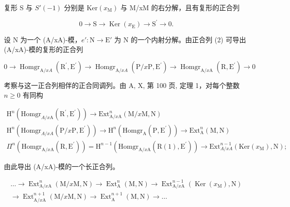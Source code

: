 复形 S 与 \(S'(-1)\) 分别是 \(\mathrm{Ker}(x_{\mathrm{M}})\) 与 M/xM 的右分解，且有复形的正合列

\[
0 \to \mathrm{S} \longrightarrow \operatorname{Ker} (x _ {\mathrm{E}}) \longrightarrow \mathrm{S} ^ {\prime} \to 0.\tag{3}
\]

设 N 为一个 (A/xA)-模，\(e': \mathrm{N} \to \mathrm{E}'\) 为 N 的一个内射分解。由正合列 (2) 可导出 (A/xA)-模的复形的正合列

\[
0 \to \operatorname{Homgr} _ {\mathrm{A} / x A} \left(\mathrm{R} ^ {\prime}, \mathrm{E} ^ {\prime}\right) \longrightarrow \operatorname{Homgr} _ {\mathrm{A} / x A} \left(\mathrm{P} / x \mathrm{P}, \mathrm{E} ^ {\prime}\right) \longrightarrow \operatorname{Homgr} _ {\mathrm{A} / x \mathrm{A}} \left(\mathrm{R}, \mathrm{E} ^ {\prime}\right)\rightarrow 0
\]

考察与这一正合列相伴的正合同调列。由 A, X, 第 100 页, 定理 1，对每个整数 \(n \geqslant 0\) 有同构

\[
\begin{array}{c} \mathrm{H} ^ {n} (\mathrm{Homgr} _ {A / x \mathrm{A}} (\mathrm{R} ^ {\prime}, \mathrm{E} ^ {\prime})) \longrightarrow \mathrm{Ext} _ {\mathrm{A} / x \mathrm{A}} ^ {n} (\mathrm{M} / x \mathrm{M}, \mathrm{N}) \\ \mathrm{H} ^ {n} (\mathrm{Homgr} _ {A / x A} (\mathrm{P} / x \mathrm{P}, \mathrm{E} ^ {\prime})) \longrightarrow \mathrm{H} ^ {n} (\mathrm{Homgr} _ {\mathrm{A}} (\mathrm{P}, \mathrm{E} ^ {\prime})) \longrightarrow \mathrm{Ext} _ {\mathrm{A}} ^ {n} (\mathrm{M}, \mathrm{N}) \\ \Pi^ {n} (\mathrm{Homgr} _ {\mathrm{A} / x \mathrm{A}} (\mathrm{R}, \mathrm{E} ^ {\prime})) = \mathrm{H} ^ {n - 1} (\mathrm{Homgr} _ {\mathrm{A} / x \mathrm{A}} (\mathrm{R} (1), \mathrm{E} ^ {\prime})) \longrightarrow \mathrm{Ext} _ {A / x A} ^ {n - 1} (\mathrm{Ker} (x _ {\mathrm{M}}), \mathrm{N}); \end{array}
\]

由此导出 (A/xA)-模的一个长正合列。

\[
\begin{array}{c} \dots \longrightarrow \operatorname{Ext} _ {\mathrm{A} / x \mathrm{A}} ^ {n} (\mathrm{M} / x \mathrm{M}, \mathrm{N}) \longrightarrow \operatorname{Ext} _ {\mathrm{A}} ^ {n} (\mathrm{M}, \mathrm{N}) \longrightarrow \operatorname{Ext} _ {\mathrm{A} / x \mathrm{A}} ^ {n - 1} (\operatorname{Ker} (x _ {\mathrm{M}}), \mathrm{N}) \\ \longrightarrow \operatorname{Ext} _ {\mathrm{A} / x \mathrm{A}} ^ {n + 1} (\mathrm{M} / x \mathrm{M}, \mathrm{N}) \longrightarrow \operatorname{Ext} _ {\mathrm{A}} ^ {n + 1} (\mathrm{M}, \mathrm{N}) \longrightarrow \dots \end{array}\tag{4}
\]


